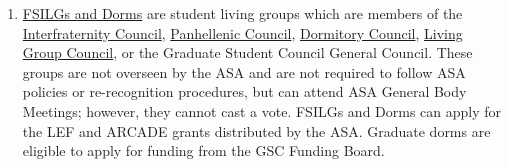 \documentclass[12pt]{article}
\def\ul{\underline}
\begin{document}
\begin{enumerate}
    \item \ul{FSILGs and Dorms} are student living groups which are members of the
        \href{http://www.mitifc.com/}{Interfraternity Council}, \href{https://www.mitpanhel.com/home}{Panhellenic Council},
        \href{https://dormcon.mit.edu/}{Dormitory Council}, \href{https://lgc.mit.edu/}{Living Group Council}, or the
        Graduate Student Council General Council.
    These groups are not overseen by the ASA and are not required to follow ASA policies or re-recognition procedures,
        but can attend ASA General Body Meetings; however, they cannot cast a vote.
    FSILGs and Dorms can apply for the LEF and ARCADE grants distributed by the ASA.
    Graduate dorms are eligible to apply for funding from the GSC Funding Board.
\end{enumerate}
\end{document}
